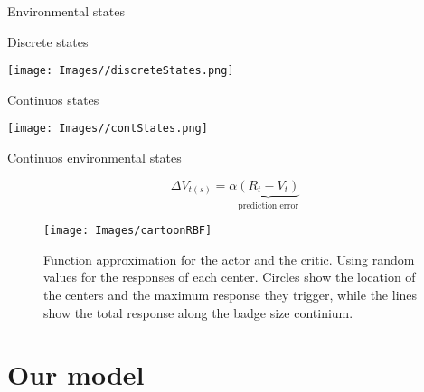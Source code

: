 \documentclass[
  ignorenonframetext,
]{beamer}
\begin{document}
\begin{frame}{Environmental states}
\protect\hypertarget{environmental-states}{}

\begin{block}{Discrete states}

\texttt{[image: Images//discreteStates.png]}

\pause

\end{block}

\begin{block}{Continuos states}

\texttt{[image: Images//contStates.png]}

\end{block}

\end{frame}

\begin{frame}{Continuos environmental states}
\protect\hypertarget{continuos-environmental-states}{}

\begin{equation*}
  \Delta V_{t(s)}=\alpha \underbrace{(R_t-V_t)}_\text{prediction error}
\end{equation*}

\begin{figure}
\texttt{[image: Images/cartoonRBF]} \caption{\label{fig:learning_cartoonRBF}Function approximation for the actor and the critic. Using random values for the responses of each center. Circles show the location of the centers and the maximum response they trigger, while the lines show the total response along the badge size continium.}\label{fig:fig2}
\end{figure}

\end{frame}

\hypertarget{our-model}{%
\section{Our model}\label{our-model}}
\end{document}
